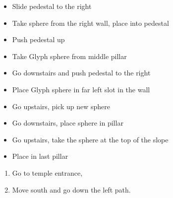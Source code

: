 \begin{trial}
    \begin{itemize}
        \item Slide pedestal to the right
        \item Take sphere from the right wall, place into pedestal
        \item Push pedestal up
        \item Take Glyph sphere from middle pillar
        \item Go downstairs and push pedestal to the right
        \item Place Glyph sphere in far left slot in the wall
        \item Go upstairs, pick up new sphere
        \item Go downstairs, place sphere in pillar
        \item Go upstairs, take the sphere at the top of the slope
        \item Place in last pillar
    \end{itemize}
\end{trial}
\begin{enumerate}[resume]
    \item Go to temple entrance, \sd
    \item Move south and go down the left path.
\end{enumerate}
